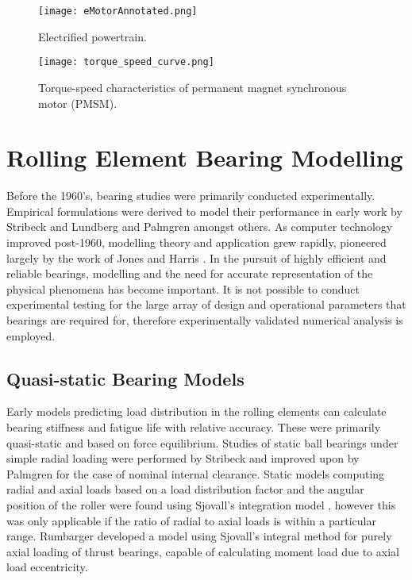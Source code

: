 \begin{figure}
	\centerline{\texttt{[image: eMotorAnnotated.png]}}
	\caption{Electrified powertrain.}
	\label{eMotorAnnotated}
\end{figure}

\begin{figure}
	\centerline{\texttt{[image: torque\_speed\_curve.png]}}
	\caption{Torque-speed characteristics of permanent magnet synchronous motor (PMSM).}
	\label{PMSM torque speed}
\end{figure}

\section{Rolling Element Bearing Modelling}

Before the 1960’s, bearing studies were primarily conducted experimentally. Empirical formulations were derived to model their performance in early work by Stribeck \cite{Stribeck1907} and Lundberg and Palmgren \cite{Lundberg1952} \cite{Palmgren1959} amongst others. As computer technology improved post-1960, modelling theory and application grew rapidly, pioneered largely by the work of Jones \cite{Jones1960} and Harris \cite{Harris1984}. In the pursuit of highly efficient and reliable bearings, modelling and the need for accurate representation of the physical phenomena has become important. It is not possible to conduct experimental testing for the large array of design and operational parameters that bearings are required for, therefore experimentally validated numerical analysis is employed.

\subsection{Quasi-static Bearing Models}

Early models predicting load distribution in the rolling elements can calculate bearing stiffness and fatigue life with relative accuracy. These were primarily quasi-static and based on force equilibrium. Studies of static ball bearings under simple radial loading were performed by Stribeck \cite{Stribeck1907} and improved upon by Palmgren \cite{Palmgren1959} for the case of nominal internal clearance. Static models computing radial and axial loads based on a load distribution factor and the angular position of the roller were found using Sjovall’s integration model \cite{Sjovall1933}, however this was only applicable if the ratio of radial to axial loads is within a particular range. Rumbarger \cite{JRumbarger1962} developed a model using Sjovall’s integral method for purely axial loading of thrust bearings, capable of calculating moment load due to axial load eccentricity. 

